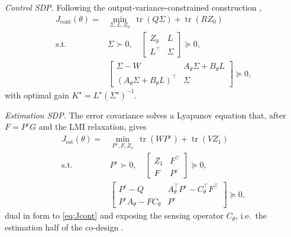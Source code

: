 \documentclass[twocolumn,amsthm]{autart}
\begin{document}
\emph{Control SDP.} Following the output-variance-constrained construction
\cite{grigoriadis1998integrate,boyd2004convex},
\begin{equation}\label{eq:Jcont}
\begin{aligned}
J_{\mathrm{cont}}(\theta) = &\min_{\Sigma,L,Z_0}\
\operatorname{tr}(Q\Sigma) + \operatorname{tr}(R Z_0)\\
\text{s.t. } & \Sigma \succ 0, \quad
\left[\begin{smallmatrix} Z_0 & L \\ L^\top & \Sigma \end{smallmatrix}\right]
\succeq 0,\\
& \left[\begin{smallmatrix}
\Sigma - W & A_\theta\Sigma + B_\theta L \\
(A_\theta\Sigma + B_\theta L)^\top & \Sigma
\end{smallmatrix}\right] \succeq 0,
\end{aligned}
\end{equation}
with optimal gain $K^\star = L^\star (\Sigma^\star)^{-1}$.

\emph{Estimation SDP.} The error covariance solves a Lyapunov equation that,
after $F = P^\varepsilon G$ and the LMI relaxation, gives
\begin{equation}\label{eq:Jest}
\begin{aligned}
J_{\mathrm{est}}(\theta) = &\min_{P^\varepsilon,F,Z_1}\
\operatorname{tr}(W P^\varepsilon) + \operatorname{tr}(V Z_1)\\
\text{s.t. } & P^\varepsilon \succ 0, \quad
\left[\begin{smallmatrix} Z_1 & F^\top \\ F & P^\varepsilon \end{smallmatrix}
\right] \succeq 0,\\
& \left[\begin{smallmatrix}
P^\varepsilon - Q & A_\theta^\top P^\varepsilon - C_\theta^\top F^\top \\
P^\varepsilon A_\theta - F C_\theta & P^\varepsilon
\end{smallmatrix}\right] \succeq 0,
\end{aligned}
\end{equation}
dual in form to \eqref{eq:Jcont} and exposing the sensing operator $C_\theta$,
i.e.\ the estimation half of the co-design \cite{li2008integrating}.
\end{document}
